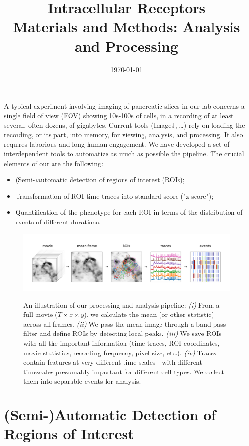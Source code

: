 \documentclass[a4paper,11pt,final]{article}
\title{Intracellular Receptors \\ {\small Materials and Methods: Analysis and Processing}}
\date{\today}
\begin{document}
\maketitle


A typical experiment involving imaging of pancreatic slices in our lab concerns a single field of view (FOV)
showing 10s-100s of cells, in a recording of at least several, often dozens, of gigabytes.
Current tools (ImageJ, \dots) rely on loading the recording, or its part, into memory, for viewing, analysis, and processing.
It also requires laborious and long human engagement.
We have developed a set of interdependent tools to automatize as much as possible the pipeline.
The crucial elements of our are the following:
\begin{itemize}
\item (Semi-)automatic detection of regions of interest (ROIs);
\item Transformation of ROI time traces into standard score ("z-score");
\item Quantification of the phenotype for each ROI in terms of the distribution of events of different durations.
\end{itemize}

\begin{figure}[h]
\centering
\includegraphics[width=17cm]{figures/pipeline.pdf}
\label{fig:pipeline}
\caption{
An illustration of our processing and analysis pipeline:
{\it (i)}  From a full movie ($T{\times}x{\times}y$), we calculate the mean (or other statistic) across all frames.
{\it (ii)} We pass the mean image through a band-pass filter and define ROIs by detecting local peaks.
{\it (iii)} We save ROIs with all the important information (time traces, ROI coordinates, movie statistics, recording frequency, pixel size, etc.).
{\it (iv)} Traces contain features at very different time scales---with different timescales presumably important for different cell types. We collect them into separable events for analysis.
}
\end{figure}

\section{(Semi-)Automatic Detection of Regions of Interest}

\end{document}
